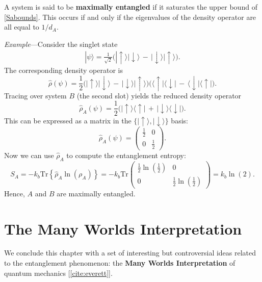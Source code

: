 \documentclass[prx,12pt]{revtex4-2}
\begin{document}
A system is said to be \textbf{maximally entangled} if it saturates
the upper bound of \eqref{Sabounds}.  This occurs if and only if the
eigenvalues of the density operator are all equal to $1/d_A$.

\begin{framed}
\noindent
\textit{Example}---Consider the singlet state
\begin{align}
  |\psi\rangle = \frac{1}{\sqrt{2}} \Big(|\!\uparrow\rangle|\!\downarrow\rangle \,-\, |\!\downarrow\rangle|\!\uparrow\rangle\Big).
\end{align}
The corresponding density operator is
\begin{equation}
  \hat{\rho}(\psi) = \frac{1}{2} \Big(|\!\uparrow\rangle|\!\downarrow\rangle \,-\, |\!\downarrow\rangle|\!\uparrow\rangle\Big) \Big(\langle\uparrow\!|\langle\downarrow\!| \,-\, \langle\downarrow\!|\langle\uparrow\!|\Big).
\end{equation}
Tracing over system $B$ (the second slot) yields the reduced density operator
\begin{equation}
  \hat{\rho}_A(\psi) = \frac{1}{2} \Big(|\!\uparrow\rangle \langle\uparrow\!| \,+\, |\!\downarrow\rangle \langle\downarrow\!|\Big).
\end{equation}
This can be expressed as a matrix in the
$\{|\!\uparrow\rangle,|\!\downarrow\rangle\}$ basis:
\begin{equation}
  \hat{\rho}_A(\psi) = \begin{pmatrix}\frac{1}{2} & 0 \\ 0 & \frac{1}{2}\end{pmatrix}.
\end{equation}
Now we can use $\hat{\rho}_A$ to compute the entanglement entropy:
\begin{equation}
  S_A = -k_b\mathrm{Tr}\left\{\hat{\rho}_A\ln(\rho_A)\right\} = -k_b\mathrm{Tr}\begin{pmatrix}\frac{1}{2}\ln\left(\frac{1}{2}\right) & 0 \\ 0 & \frac{1}{2}\ln\left(\frac{1}{2}\right)\end{pmatrix} = k_b\ln(2).
\end{equation}
Hence, $A$ and $B$ are maximally entangled.
\end{framed}

\section{The Many Worlds Interpretation}

We conclude this chapter with a set of interesting but controversial
ideas related to the entanglement phenomenon: the \textbf{Many Worlds
  Interpretation} of quantum mechanics [\ref{cite:everett}].
\end{document}
